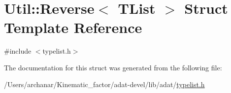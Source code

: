 \hypertarget{structUtil_1_1TL_1_1Reverse}{}\section{Util\+:\+:Reverse$<$ T\+List $>$ Struct Template Reference}
\label{structUtil_1_1TL_1_1Reverse}


{\ttfamily \#include $<$typelist.\+h$>$}



The documentation for this struct was generated from the following file\+:\begin{DoxyCompactItemize}
\item 
/\+Users/archanar/\+Kinematic\+\_\+factor/adat-\/devel/lib/adat/\mbox{\hyperlink{adat-devel_2lib_2adat_2typelist_8h}{typelist.\+h}}\end{DoxyCompactItemize}
